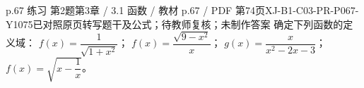 \par\noindent\begin{minipage}{\linewidth}
\begin{bankitem}{p.67 练习 第2题}{第3章 / 3.1 函数 / 教材 p.67 / PDF 第74页}{XJ-B1-C03-PR-P067-Y1075}{已对照原页转写题干及公式；待教师复核；未制作答案}
确定下列函数的定义域：
$f(x)=\dfrac1{\sqrt{1+x^2}}$；
$f(x)=\dfrac{\sqrt{9-x^2}}x$；
$g(x)=\dfrac x{x^2-2x-3}$；
$f(x)=\sqrt{x-\dfrac1x}$。
\end{bankitem}
\end{minipage}\par\medskip
